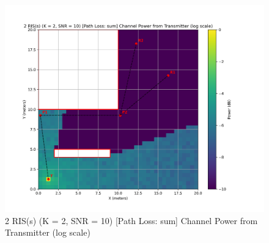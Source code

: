 \begin{figure}[H]
  \centering
  \includegraphics[width=0.8\linewidth]{imgs/heatmap-simulations/2 RIS(s) (K = 2, SNR = 10) [Path Loss_ sum] Channel Power from Transmitter (log scale).png}
  \caption{2 RIS(s) (K = 2, SNR = 10) [Path Loss: sum] Channel Power from Transmitter (log scale)}
\end{figure}

